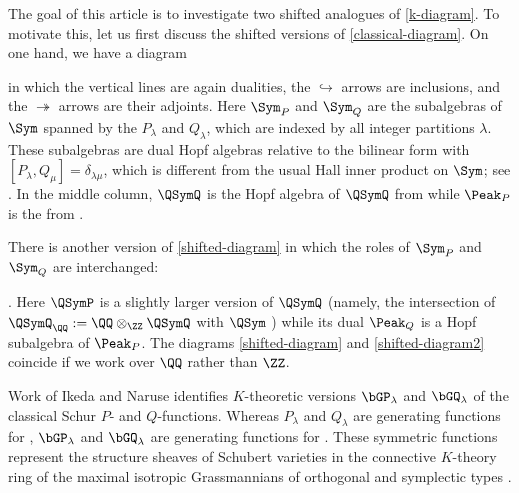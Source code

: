 The goal of this article is to investigate two shifted analogues of \eqref{k-diagram}.
To motivate this, let us first discuss the shifted versions of  \eqref{classical-diagram}.
On one hand, we have a diagram
\be\label{shifted-diagram}
\ee
in which the vertical lines are again dualities, the $\hookrightarrow$ arrows are inclusions, and 
the $\twoheadrightarrow$ arrows are their adjoints.
Here  $\Sym_P$ and $\Sym_Q$ are the subalgebras of $\Sym$
spanned by the  $P_\lambda$ and  $Q_\lambda$,
which are indexed by all  integer partitions $\lambda$.
These subalgebras are dual Hopf algebras relative to the bilinear form with $[ P_\lambda, Q_\mu] = \delta_{\lambda\mu}$,
which is different from the usual Hall inner product on $\Sym$;
see \cite[Appendix A]{Stembridge1997a}.
In the middle column, $\QSymQ$ is the Hopf algebra of 
$\QSymQ$ from \cite{Stembridge1997a} while  $\Peak_P$ is the  from \cite{Nyman,Schocker}.

There is another version of \eqref{shifted-diagram} 
in which the roles of $\Sym_P$ and $\Sym_Q$ are interchanged:
\be\label{shifted-diagram2}
.
\ee
Here $\QSymP$ is a slightly larger version of $\QSymQ$ (namely,  the intersection of $\QSymQ_\QQ := \QQ \otimes_\ZZ \QSymQ$ with $\QSym$ \cite[\S3]{Stembridge1997a})
while its dual $\Peak_Q$ is a Hopf subalgebra of $\Peak_P$.
The diagrams \eqref{shifted-diagram} and \eqref{shifted-diagram2} coincide if we work over $\QQ$ rather than $\ZZ$.


Work of Ikeda and Naruse  \cite{IkedaNaruse} identifies
$K$-theoretic versions $\bGP_\lambda$ and $\bGQ_\lambda$ of the classical Schur $P$- and $Q$-functions.
Whereas $P_\lambda$ and $Q_\lambda$
are generating functions for ,
$\bGP_\lambda$ and $\bGQ_\lambda$  are generating functions for 
 \cite[Thm.~9.1]{IkedaNaruse}.
These symmetric functions represent the structure sheaves of Schubert varieties in the connective $K$-theory ring of the maximal isotropic Grassmannians of orthogonal and symplectic types \cite[Cor.~8.1]{IkedaNaruse}.

